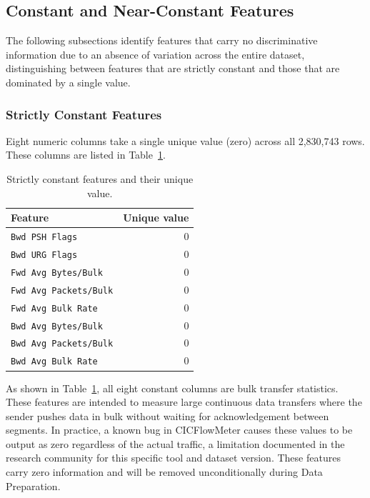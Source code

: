 \documentclass[12pt,a4paper]{article}
\begin{document}
\subsection{Constant and Near-Constant Features}

The following subsections identify features that carry no discriminative information due
to an absence of variation across the entire dataset, distinguishing between features
that are strictly constant and those that are dominated by a single value.

\subsubsection{Strictly Constant Features}
\label{sec:constant}

Eight numeric columns take a single unique value (zero) across all 2,830,743 rows.
These columns are listed in Table~\ref{tab:constant}.

\begin{table}[H]
    \centering
    \caption{Strictly constant features and their unique value.}
    \label{tab:constant}
    \begin{tabular}{|l|r|}
        \hline
        \textbf{Feature}              & \textbf{Unique value} \\
        \hline
        \texttt{Bwd PSH Flags}        & 0                     \\
        \hline
        \texttt{Bwd URG Flags}        & 0                     \\
        \hline
        \texttt{Fwd Avg Bytes/Bulk}   & 0                     \\
        \hline
        \texttt{Fwd Avg Packets/Bulk} & 0                     \\
        \hline
        \texttt{Fwd Avg Bulk Rate}    & 0                     \\
        \hline
        \texttt{Bwd Avg Bytes/Bulk}   & 0                     \\
        \hline
        \texttt{Bwd Avg Packets/Bulk} & 0                     \\
        \hline
        \texttt{Bwd Avg Bulk Rate}    & 0                     \\
        \hline
    \end{tabular}
\end{table}

As shown in Table~\ref{tab:constant}, all eight constant columns are bulk transfer
statistics. These features are intended to measure large continuous data transfers where
the sender pushes data in bulk without waiting for acknowledgement between segments. In
practice, a known bug in CICFlowMeter causes these values to be output as zero regardless
of the actual traffic, a limitation documented in the research community for this specific
tool and dataset version. These features carry zero information and will be removed
unconditionally during Data Preparation.
\end{document}
